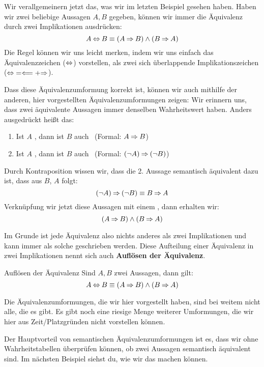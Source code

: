\documentclass[../../main.tex]{subfiles}
\begin{document}
    Wir verallgemeinern jetzt das, was wir im letzten Beispiel gesehen haben.
     Haben wir zwei beliebige Aussagen $A,B$ gegeben, können wir immer die Äquivalenz
     durch zwei Implikationen ausdrücken:
    \[A \mathbin{\Leftrightarrow} B \equiv (A \mathbin{\Rightarrow} B) \land (B \mathbin{\Rightarrow} A)\]
    Die Regel können wir uns leicht merken, indem wir uns einfach das Äquivalenzzeichen
    ($\mathbin{\Leftrightarrow}$) vorstellen, als zwei sich überlappende Implikationszeichen ($\mathbin{\Leftrightarrow} = \Longleftarrow + \mathbin{\Rightarrow}$).

    Dass diese Äquivalenzumformung korrekt ist, können wir auch mithilfe der anderen, hier vorgestellten Äquivalenzumformungen 
    zeigen: Wir erinnern uns, dass zwei äquivalente Aussagen 
    immer denselben Wahrheitswert haben. Anders ausgedrückt heißt das:
    \begin{enumerate}
        \item Ist $A$ \wahr, dann ist $B$ auch \wahr\  (Formal: $A \mathbin{\Rightarrow} B$)
        \item Ist $A$ \falsch, dann ist $B$ auch \falsch\  (Formal: $(\lnot A) \mathbin{\Rightarrow} (\lnot B)$)
    \end{enumerate}
    Durch Kontraposition wissen wir, dass die 2. Aussage semantisch äquivalent dazu ist,
    dass aus $B$, $A$ folgt:
    \[(\lnot A) \mathbin{\Rightarrow} (\lnot B) \equiv B \mathbin{\Rightarrow} A\]
    Verknüpfung wir jetzt diese Aussagen mit einem , dann erhalten wir:
    \[(A \mathbin{\Rightarrow} B) \land (B \mathbin{\Rightarrow} A)\]
    
    Im Grunde ist jede Äquivalenz also nichts anderes als zwei Implikationen und kann immer als solche geschrieben werden. 
    Diese Aufteilung einer Äquivalenz in zwei Implikationen nennt sich auch \textbf{Auflösen der Äquivalenz}.
    
    \begin{theorem}{Auflösen der Äquivalenz}
    Sind $A,B$ zwei Aussagen, dann gilt:
        \[ A \mathbin{\Leftrightarrow} B \equiv (A \mathbin{\Rightarrow} B) \land (B \mathbin{\Rightarrow} A)\]
    \end{theorem}

    Die Äquivalenzumformungen, die wir hier vorgestellt haben, sind bei weitem nicht alle, die es gibt. Es gibt
    noch eine riesige Menge weiterer Umformungen, die wir hier aus Zeit/Platzgründen nicht vorstellen können.
    
    Der Hauptvorteil von semantischen Äquivalenzumformungen ist es, dass wir ohne
    Wahrheitstabellen überprüfen können, ob zwei Aussagen semantisch äquivalent sind. 
    Im nächsten Beispiel siehst du, wie wir das machen können.
\end{document}
